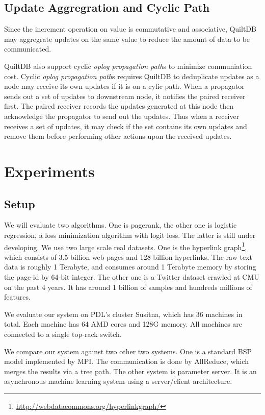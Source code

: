 \documentclass[11pt, twocolumn]{article}
\begin{document}
\subsection{Update Aggregration and Cyclic Path}
\label{sec:update-aggreg}
\label{sec:cyclic-path}

Since the increment operation on value is commutative and associative, QuiltDB
may aggregrate updates on the same value to reduce the amount of data to be
communicated.

QuiltDB also support cyclic \emph{oplog propagation path}s to minimize
communiation cost. Cyclic \emph{oplog propagation path}s requires QuiltDB to
deduplicate updates as a node may receive its own updates if it is on a cylic
path. When a propagator sends out a set of updates to downstream node, it
notifies the paired receiver first. The paired receiver records the updates
generated at this node then acknowledge the propagator to send out the updates.
Thus when a receiver receives a set of updates, it may check if the set contains
its own updates and remove them before performing other actions upon the
received updates.


\section{Experiments}

\subsection{Setup}

We will evaluate two algorithms. One is pagerank, the other one is logistic
regression, a loss minimization algorithm with logit loss. The latter is still
under developing. We use two large scale real datasets. One is the hyperlink
graph\footnote{\url{http://webdatacommons.org/hyperlinkgraph/}}, which consists
of 3.5 billion web pages and 128 billion hyperlinks. The raw text data is
roughly 1 Terabyte, and consumes around 1 Terabyte memory by storing the page-id
by 64-bit integer. The other one is a Twitter dataset crawled at CMU on the past
4 years. It has around 1 billion of samples and hundreds millions of
features.

We evaluate our system on PDL's cluster Susitna, which has 36 machines in
total. Each machine has 64 AMD cores and 128G memory. All machines are connected
to a single top-rack switch.

We compare our system against two other two systems. One is a standard BSP
model implemented by MPI. The communication is done by AllReduce, which merges
the results via a tree path. The other system is parameter server. It is an
asynchronous machine learning system using a server/client architecture.
\end{document}

